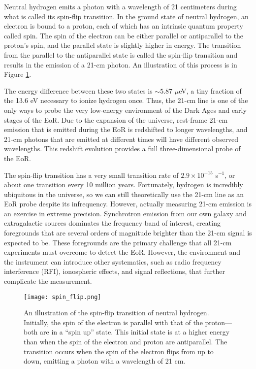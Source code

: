 \documentclass[12pt]{article}
\begin{document}
Neutral hydrogen emits a photon with a wavelength of 21 centimeters during what is called its spin-flip transition. In the ground state of neutral hydrogen, an electron is bound to a proton, each of which has an intrinsic quantum property called spin. The spin of the electron can be either parallel or antiparallel to the proton's spin, and the parallel state is slightly higher in energy. The transition from the parallel to the antiparallel state is called the spin-flip transition and results in the emission of a 21-cm photon. An illustration of this process is in Figure \ref{fig:spin_flip}.

The energy difference between these two states is $\sim 5.87$ $\mu$eV, a tiny fraction of the 13.6 eV necessary to ionize hydrogen once. Thus, the 21-cm line is one of the only ways to probe the very low-energy environment of the Dark Ages and early stages of the EoR. Due to the expansion of the universe, rest-frame 21-cm emission that is emitted during the EoR is redshifted to longer wavelengths, and 21-cm photons that are emitted at different times will have different observed wavelengths. This redshift evolution provides a full three-dimensional probe of the EoR.

The spin-flip transition has a very small transition rate of $2.9 \times 10^{-15}$ s$^{-1}$, or about one transition every 10 million years. Fortunately, hydrogen is incredibly ubiquitous in the universe, so we can still theoretically use the 21-cm line as an EoR probe despite its infrequency. However, actually measuring 21-cm emission is an exercise in extreme precision. Synchrotron emission from our own galaxy and extragalactic sources dominates the frequency band of interest, creating foregrounds that are several orders of magnitude brighter than the 21-cm signal is expected to be. These foregrounds are the primary challenge that all 21-cm experiments must overcome to detect the EoR. However, the environment and the instrument can introduce other systematics, such as radio frequency interference (RFI), ionospheric effects, and signal reflections, that further complicate the measurement. \vspace{3mm}

\begin{figure}[t]
	\centering
	\texttt{[image: spin\_flip.png]}
	\caption[The spin-flip transition of neutral hydrogen]{An illustration of the spin-flip transition of neutral hydrogen. Initially, the spin of the electron is parallel with that of the proton---both are in a ``spin up'' state. This initial state is at a higher energy than when the spin of the electron and proton are antiparallel. The transition occurs when the spin of the electron flips from up to down, emitting a photon with a wavelength of 21 cm.}
	\label{fig:spin_flip}
\end{figure}
\end{document}
